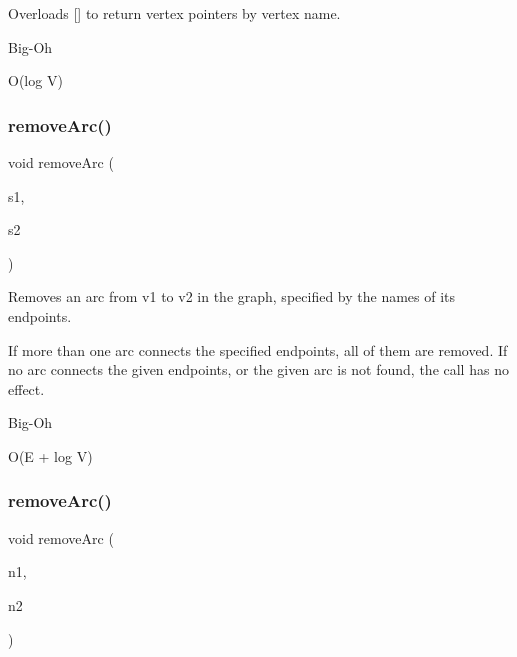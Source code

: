 Overloads {\ttfamily \mbox{[}\mbox{]}} to return vertex pointers by vertex name. 

\begin{DoxyRefDesc}{Big-\/\+Oh}
\item[\mbox{\hyperlink{BigOh__BigOh000039}{Big-\/\+Oh}}]O(log V) \end{DoxyRefDesc}
\mbox{\label{classGraph_af6370fb52d2dab4eb7795da22c33dd02}} 
\subsubsection{\texorpdfstring{remove\+Arc()}{removeArc()}\hspace{0.1cm}{\footnotesize\ttfamily [1/3]}}
{\footnotesize\ttfamily void remove\+Arc (\begin{DoxyParamCaption}\item[{const std\+::string \&}]{s1,  }\item[{const std\+::string \&}]{s2 }\end{DoxyParamCaption})\hspace{0.3cm}{\ttfamily [inherited]}}



Removes an arc from v1 to v2 in the graph, specified by the names of its endpoints. 

If more than one arc connects the specified endpoints, all of them are removed. If no arc connects the given endpoints, or the given arc is not found, the call has no effect. \begin{DoxyRefDesc}{Big-\/\+Oh}
\item[\mbox{\hyperlink{BigOh__BigOh000084}{Big-\/\+Oh}}]O(E + log V) \end{DoxyRefDesc}
\mbox{\label{classGraph_ae0c9f44b20b49ffae9fecc0a4f156ac1}} 
\subsubsection{\texorpdfstring{remove\+Arc()}{removeArc()}\hspace{0.1cm}{\footnotesize\ttfamily [2/3]}}
{\footnotesize\ttfamily void remove\+Arc (\begin{DoxyParamCaption}\item[{\mbox{\hyperlink{classVertexGen}{Vertex\+Gen}}$<$ V, E $>$  $\ast$}]{n1,  }\item[{\mbox{\hyperlink{classVertexGen}{Vertex\+Gen}}$<$ V, E $>$  $\ast$}]{n2 }\end{DoxyParamCaption})\hspace{0.3cm}{\ttfamily [inherited]}}



